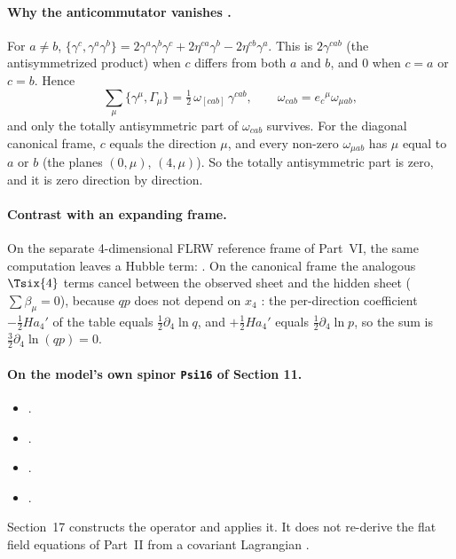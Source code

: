 \paragraph{Why the anticommutator vanishes \cfderived.} For $a\neq b$,
$\{\gamma^c,\gamma^a\gamma^b\}=2\gamma^a\gamma^b\gamma^c+2\eta^{ca}\gamma^b-2\eta^{cb}\gamma^a$.
This is $2\gamma^{cab}$ (the antisymmetrized product) when $c$ differs from both $a$ and $b$, and
$0$ when $c=a$ or $c=b$. Hence
\begin{equation}\label{csc:eq:antisym}
  \sum_\mu\{\gamma^\mu,\Gamma_\mu\}=\tfrac12\,\omega_{[cab]}\,\gamma^{cab},\qquad \omega_{cab}=e_c{}^\mu\omega_{\mu ab},
\end{equation}
and only the totally antisymmetric part of $\omega_{cab}$ survives. For the diagonal canonical
frame, $c$ equals the direction $\mu$, and every non-zero $\omega_{\mu ab}$ has $\mu$ equal to $a$
or $b$ (the planes $(0,\mu)$, $(4,\mu)$). So the totally antisymmetric part is zero, and it is zero
direction by direction.

\paragraph{Contrast with an expanding frame.} On the separate 4-dimensional FLRW reference frame of
Part~VI, the same computation leaves a Hubble term: 
.
On the canonical frame the analogous $\Tsix{4}$ terms cancel between the observed sheet and the
hidden sheet ($\sum\beta_\mu=0$), because $qp$ does not depend on $x_4$ \cfderived: the
per-direction coefficient $-\tfrac12Ha_4'$ of the table equals $\tfrac12\partial_4\ln q$, and
$+\tfrac12Ha_4'$ equals $\tfrac12\partial_4\ln p$, so the sum is $\tfrac32\partial_4\ln(qp)=0$.

\paragraph{On the model's own spinor \texttt{Psi16} of Section 11.}
\begin{itemize}
  \item {} .
  \item {} .
  \item {} .
  \item {} .
\end{itemize}
Section~17 constructs the operator and applies it. It does not re-derive the flat field equations
of Part~II from a covariant Lagrangian .

